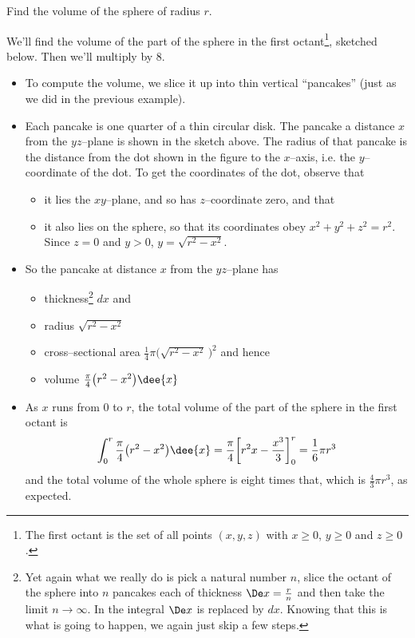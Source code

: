 \goodbreak
\begin{eg}[Sphere]\label{eg:VOLs}
Find the volume of the sphere of radius $r$.

\soln We'll find the volume of the part of the sphere in the first octant\footnote{The
first octant is the set of all points $(x,y,z)$ with $x\ge 0$, $y\ge 0$ and $z\ge 0$.},
sketched below. Then we'll multiply by $8$.

\begin{itemize}
 \item To compute the volume,
%
we slice it up into thin vertical ``pancakes'' (just as we did in the previous example).

\item Each pancake is one quarter of a thin circular disk. The pancake a distance $x$
from the $yz$--plane is shown in the sketch above. The radius of that pancake is the
distance from the dot shown in the figure to the $x$--axis, i.e. the $y$--coordinate
of the dot. To get the coordinates of the dot, observe that
\begin{itemize}
\item it lies the $xy$--plane, and so has $z$--coordinate zero,
and that
\item it also lies on the sphere, so that its coordinates obey
$x^2+y^2+z^2=r^2$. Since $z=0$ and $y>0$, $y=\sqrt{r^2-x^2}$.
\end{itemize}
\item So the pancake at distance $x$ from the $yz$--plane has
\begin{itemize}
\item thickness\footnote{Yet again what we really do is pick a natural
number $n$, slice the octant of the sphere into $n$ pancakes each of thickness
$\De x=\frac{r}{n}$ and then take the limit $n\rightarrow\infty$.
In the integral $\De x$ is replaced by $dx$. Knowing that this is what
is going to happen, we again just skip a few steps.} $dx$ and
\item
radius $\sqrt{r^2-x^2}$
\item cross--sectional area $\frac{1}{4}\pi \big(\sqrt{r^2-x^2}\,\big)^2$
and hence
\item
volume $\frac{\pi}{4} \big(r^2-x^2\big)\dee{x}$
\end{itemize}
\item As $x$ runs from $0$ to $r$, the total volume of the part of the sphere
in the first octant is
\begin{align*}
\int_0^r \frac{\pi}{4} \big(r^2-x^2\big)\dee{x}
=\frac{\pi}{4}\bigg[r^2x-\frac{x^3}{3}\bigg]_0^r
=\frac{1}{6}\pi r^3
\end{align*}
and the total volume of the whole sphere is eight times that, which is
$\frac{4}{3}\pi r^3$, as expected.
\end{itemize}
\end{eg}


